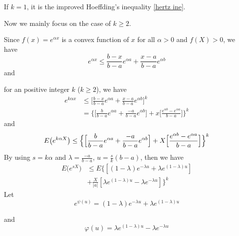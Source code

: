 \documentclass[journal]{IEEEtran}
\begin{document}
\begin{IEEEproof}
If $k=1$, it is the improved Hoeffding's inequality \ref{hertz ine}.

Now we mainly focus on the case of $k\geq 2$.

Since $f(x)=e^{\alpha x}$ is a convex function of $x$ for all $\alpha >0$ and $f(X)>0$, we have
\begin{equation}
  e^{\alpha x}\leq \frac{b-x}{b-a}e^{\alpha a}+\frac{x-a}{b-a}e^{\alpha b}
\end{equation}
and

for an positive integer $k$ ($k\geq2$), we have
\begin{equation}
\begin{split}
   e^{k\alpha x}{}&\leq \Big[\frac{b-x}{b-a}e^{\alpha a}+\frac{x-a}{b-a}e^{\alpha b}\Big]^k{}\\
   &=\Big\{\Big[\frac{b}{b-a}e^{\alpha a}+\frac{-a}{b-a}e^{\alpha b}\Big]+x\Big[\frac{e^{\alpha b}-e^{\alpha a}}{b-a}\Big]\Big\}^k
      \end{split}
\end{equation}
and
\begin{equation}
   E\big(e^{k\alpha X}\big)\leq \Big\{\Big[\frac{b}{b-a}e^{\alpha a}+\frac{-a}{b-a}e^{\alpha b}\Big]+X\Big[\frac{e^{\alpha b}-e^{\alpha a}}{b-a}\Big]\Big\}^k\\
   \end{equation}
   By using $ s=k\alpha$ and $\lambda=\frac{-a}{b-a}$, $u=\frac{s}{k}(b-a)$, then we have
\begin{equation}
\begin{split}
   E\big(e^{s X}\big){}&\leq E\Big\{[(1-\lambda)e^{-\lambda u}+\lambda e^{(1-\lambda)u}]{}\\
   &+\frac{X}{|a|}[\lambda e^{(1-\lambda)u}-\lambda e^{-\lambda u}]\Big\}^k
   \end{split}
\end{equation}
Let
\begin{equation}
e^{\psi(u)}=(1-\lambda)e^{-\lambda u}+\lambda e^{(1-\lambda)u}
\end{equation}

 and
 \begin{equation}
 \varphi(u)=\lambda e^{(1-\lambda)u}-\lambda e^{-\lambda u}
 \end{equation}


\end{IEEEproof}
\end{document}
